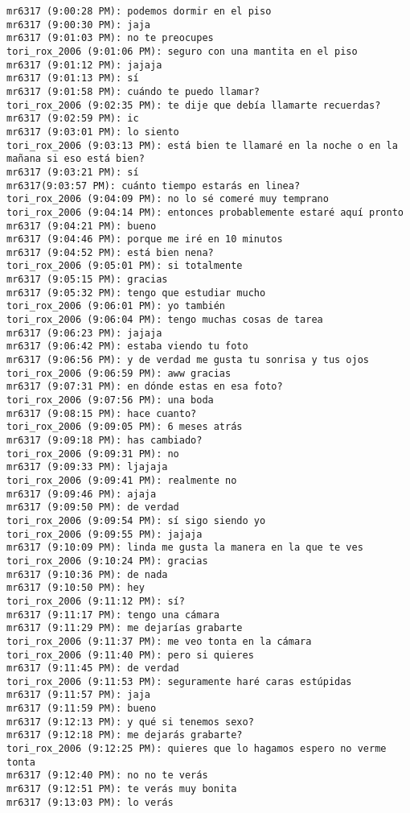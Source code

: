 \begin{verbatim}
mr6317 (9:00:28 PM): podemos dormir en el piso
mr6317 (9:00:30 PM): jaja
mr6317 (9:01:03 PM): no te preocupes
tori_rox_2006 (9:01:06 PM): seguro con una mantita en el piso
mr6317 (9:01:12 PM): jajaja
mr6317 (9:01:13 PM): sí
mr6317 (9:01:58 PM): cuándo te puedo llamar?
tori_rox_2006 (9:02:35 PM): te dije que debía llamarte recuerdas?
mr6317 (9:02:59 PM): ic
mr6317 (9:03:01 PM): lo siento
tori_rox_2006 (9:03:13 PM): está bien te llamaré en la noche o en la mañana si eso está bien?
mr6317 (9:03:21 PM): sí
mr6317(9:03:57 PM): cuánto tiempo estarás en linea?
tori_rox_2006 (9:04:09 PM): no lo sé comeré muy temprano
tori_rox_2006 (9:04:14 PM): entonces probablemente estaré aquí pronto
mr6317 (9:04:21 PM): bueno
mr6317 (9:04:46 PM): porque me iré en 10 minutos
mr6317 (9:04:52 PM): está bien nena?
tori_rox_2006 (9:05:01 PM): si totalmente
mr6317 (9:05:15 PM): gracias
mr6317 (9:05:32 PM): tengo que estudiar mucho
tori_rox_2006 (9:06:01 PM): yo también
tori_rox_2006 (9:06:04 PM): tengo muchas cosas de tarea
mr6317 (9:06:23 PM): jajaja
mr6317 (9:06:42 PM): estaba viendo tu foto
mr6317 (9:06:56 PM): y de verdad me gusta tu sonrisa y tus ojos
tori_rox_2006 (9:06:59 PM): aww gracias
mr6317 (9:07:31 PM): en dónde estas en esa foto?
tori_rox_2006 (9:07:56 PM): una boda
mr6317 (9:08:15 PM): hace cuanto?
tori_rox_2006 (9:09:05 PM): 6 meses atrás
mr6317 (9:09:18 PM): has cambiado?
tori_rox_2006 (9:09:31 PM): no
mr6317 (9:09:33 PM): ljajaja
tori_rox_2006 (9:09:41 PM): realmente no
mr6317 (9:09:46 PM): ajaja
mr6317 (9:09:50 PM): de verdad
tori_rox_2006 (9:09:54 PM): sí sigo siendo yo
tori_rox_2006 (9:09:55 PM): jajaja
mr6317 (9:10:09 PM): linda me gusta la manera en la que te ves
tori_rox_2006 (9:10:24 PM): gracias
mr6317 (9:10:36 PM): de nada
mr6317 (9:10:50 PM): hey
tori_rox_2006 (9:11:12 PM): sí?
mr6317 (9:11:17 PM): tengo una cámara
mr6317 (9:11:29 PM): me dejarías grabarte
tori_rox_2006 (9:11:37 PM): me veo tonta en la cámara
tori_rox_2006 (9:11:40 PM): pero si quieres
mr6317 (9:11:45 PM): de verdad
tori_rox_2006 (9:11:53 PM): seguramente haré caras estúpidas
mr6317 (9:11:57 PM): jaja
mr6317 (9:11:59 PM): bueno
mr6317 (9:12:13 PM): y qué si tenemos sexo?
mr6317 (9:12:18 PM): me dejarás grabarte?
tori_rox_2006 (9:12:25 PM): quieres que lo hagamos espero no verme tonta
mr6317 (9:12:40 PM): no no te verás
mr6317 (9:12:51 PM): te verás muy bonita
mr6317 (9:13:03 PM): lo verás

\end{verbatim}